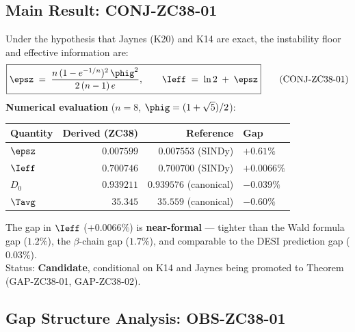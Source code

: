 \documentclass[12pt, a4paper]{article}
\begin{document}
\subsection{Main Result: CONJ-ZC38-01}
\label{sec:main}

\begin{keybox}[title={CONJ-ZC38-01: Candidate Derivation of $\Ieff$ (gap $+0.0066\%$)}]
\sloppy
Under the hypothesis that Jaynes (K20) and K14 are exact,
the instability floor and effective information are:
\[
  \boxed{
  \epsz \;=\; \frac{n\,(1-e^{-1/n})^2\,\phig^2}{2\,(n-1)\,e},
  \qquad
  \Ieff \;=\; \ln 2 \;+\; \epsz
  }
  \tag{CONJ-ZC38-01}
\]
\textbf{Numerical evaluation} ($n=8$, $\phig = (1+\sqrt{5})/2$):
\begin{center}
\renewcommand{\arraystretch}{1.3}
\begin{tabular}{lrrl}
\toprule
Quantity & Derived (ZC38) & Reference & Gap \\
\midrule
$\epsz$ & $0.007599$ & $0.007553$ (SINDy) & $+0.61\%$ \\
$\Ieff$ & $0.700746$ & $0.700700$ (SINDy) & $+0.0066\%$ \\
$D_0$   & $0.939211$ & $0.939576$ (canonical) & $-0.039\%$ \\
$\Tavg$ & $35.345$   & $35.559$ (canonical)   & $-0.60\%$ \\
\bottomrule
\end{tabular}
\end{center}
\medskip
The gap in $\Ieff$ ($+0.0066\%$) is \textbf{near-formal} ---
tighter than the Wald formula gap ($1.2\%$), the $\beta$-chain gap ($1.7\%$),
and comparable to the DESI prediction gap ($0.03\%$).\\[0.3em]
Status: \textbf{Candidate}, conditional on K14 and Jaynes being promoted
to Theorem (GAP-ZC38-01, GAP-ZC38-02).
\end{keybox}

\subsection{Gap Structure Analysis: OBS-ZC38-01}
\label{sec:gaps}
\end{document}
